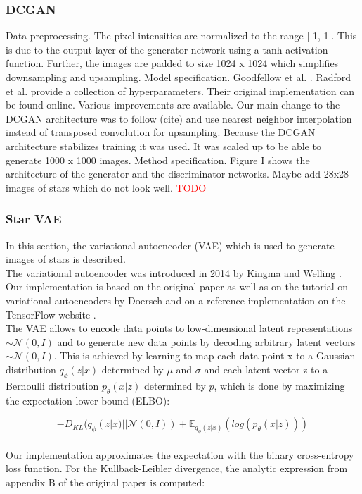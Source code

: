 \documentclass[10pt,conference,compsocconf]{IEEEtran}
\newcommand\TODO[1]{\textcolor{red}{#1}} %
\begin{document}
\subsubsection{DCGAN}
Data preprocessing. The pixel intensities are normalized to the range [-1, 1]. This is due to the output layer of the generator network using a tanh activation function. Further, the images are padded to size 1024 x 1024 which simplifies downsampling and upsampling. Model specification. Goodfellow et al. \cite{NIPS2014_5423}. Radford et al. provide a collection of hyperparameters. Their original implementation can be found online. Various improvements are available. Our main change to the DCGAN architecture was to follow (cite) and use nearest neighbor interpolation instead of transposed convolution for upsampling. Because the DCGAN architecture stabilizes training it was used. It was scaled up to be able to generate 1000 x 1000 images. Method specification. Figure I shows the architecture of the generator and the discriminator networks. Maybe add 28x28 images of stars which do not look well. 
\TODO{TODO}
\subsubsection{Star VAE} %
In this section, the variational autoencoder (VAE) which is used to generate images of stars is described. \\
The variational autoencoder was introduced in 2014 by Kingma and Welling \cite{DBLP:journals/corr/KingmaW13}. Our implementation is based on the original paper as well as on the tutorial on variational autoencoders by Doersch \cite{doersch2016tutorial} and on a reference implementation on the TensorFlow website \cite{cvaetf}. \\
The VAE allows to encode data points to low-dimensional latent representations  $\sim\mathcal{N}(0, I)$ and to generate new data points by decoding arbitrary latent vectors $\sim\mathcal{N}(0, I)$. This is achieved by learning to map each data point x to a Gaussian distribution $q_{\phi}(z|x)$ determined by $\mu$ and $\sigma$ and each latent vector z to a Bernoulli distribution $p_{\theta}(x|z)$ determined by $p$, which is done by maximizing the expectation lower bound (ELBO):

\[
-D_{KL}(q_{\phi}(z|x)||\mathcal{N}(0, I)) + \mathbb{E}_{q_{\phi}(z|x)}(log(p_{\theta}(x|z)))
\]
\\
Our implementation approximates the expectation with the binary cross-entropy loss function. For the Kullback-Leibler divergence, the analytic expression from appendix B of the original paper is computed:
\end{document}
